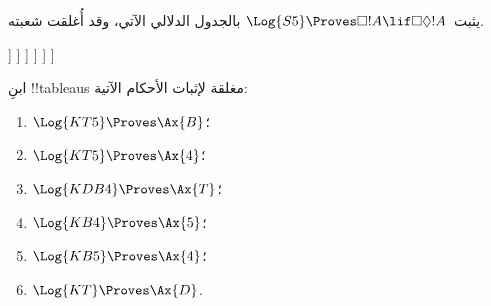 \documentclass[../../../include/open-logic-section]{subfiles}
\begin{document}
\begin{ex}
  يثبت~$\Log{S5} \Proves
  \Box!A \lif \Box\Diamond!A$ بالجدول الدلالي الآتي، وقد أُغلقت شعبته.
  \begin{oltableau}
    [\pFmla{\False}{\Box\formula{A} \lif \Box\Diamond \formula{A}}{1},
      just = \TAss
      [\pFmla{\True}{\Box \formula{A}}{1}, just = {\TRule{\False}{\lif}[1]}
        [\pFmla{\False}{\Box\Diamond \formula{A}}{1},
          just = {\TRule{\False}{\lif}[1]}
          [\pFmla{\False}{\Diamond \formula{A}}{1.1},
            just = {\TRule{\False}{\Box}[3]}
            [\pFmla{\False}{\Diamond \formula{A}}{1},
              just = {4r$\Diamond$ 4}
              [\pFmla{\False}{\formula{A}}{1.1},
                just = {\TRule{\False}{\Diamond}[5]}
                [\pFmla{\True}{\formula{A}}{1.1},
                  just = {\TRule{\True}{\Box}[2]}, close]
              ]
            ]
          ]
        ]
      ]
    ]
  \end{oltableau}
\end{ex}

\begin{prob}
ابنِ !!{tableau}s مغلقة لإثبات الأحكام الآتية:
  \begin{enumerate}
  \item $\Log{KT5} \Proves \Ax{B}$؛
  \item $\Log{KT5} \Proves \Ax{4}$؛
  \item $\Log{KDB4} \Proves \Ax{T}$؛
  \item $\Log{KB4} \Proves \Ax{5}$؛
  \item $\Log{KB5} \Proves \Ax{4}$؛
  \item $\Log{KT} \Proves \Ax{D}$.
  \end{enumerate}
\end{prob}
\end{document}
